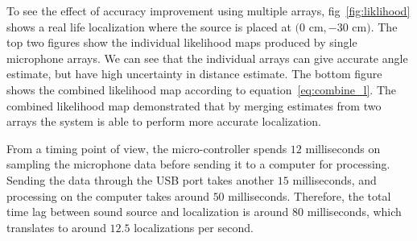 To see the effect of accuracy improvement using multiple arrays, fig~\ref{fig:liklihood} shows a real life localization where the source is placed at $(0$ cm$,-30$ cm$)$. The top two figures show the individual likelihood maps produced by single microphone arrays. We can see that the individual arrays can give accurate angle estimate, but have high uncertainty in distance estimate. The bottom figure shows the combined likelihood map according to equation~\ref{eq:combine_l}. The combined likelihood map demonstrated that by merging estimates from two arrays the system is able to perform more accurate localization. 


From a timing point of view, the micro-controller spends $12$ milliseconds on sampling the microphone data before sending it to a computer for processing. Sending the data through the USB port takes another $15$ milliseconds, and processing on the computer takes around $50$ milliseconds. Therefore, the total time lag between sound source and localization is around $80$ milliseconds, which translates to around $12.5$ localizations per second.
